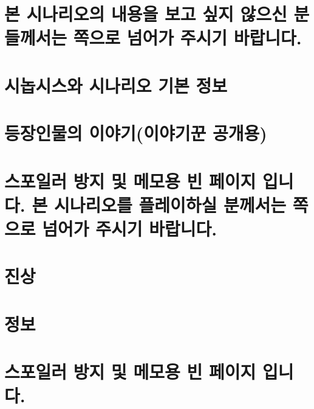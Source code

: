 \documentclass{report}
\begin{document}
	\chapter*{본 시나리오의 내용을 보고 싶지 않으신 분들께서는 \pageref{endof_Tower}쪽으로 넘어가 주시기 바랍니다.}
	
	\chapter{시놉시스와 시나리오 기본 정보}
	
	\chapter{등장인물의 이야기(이야기꾼 공개용)}
	
	\chapter*{스포일러 방지 및 메모용 빈 페이지 입니다. 본 시나리오를 플레이하실 분께서는 \pageref{endof_Unliving}쪽으로 넘어가 주시기 바랍니다.}
	
	\parttoc
	
	\chapter{진상}
		
	
	\chapter{정보}
		
	\chapter*{스포일러 방지 및 메모용 빈 페이지 입니다.}
\end{document}
